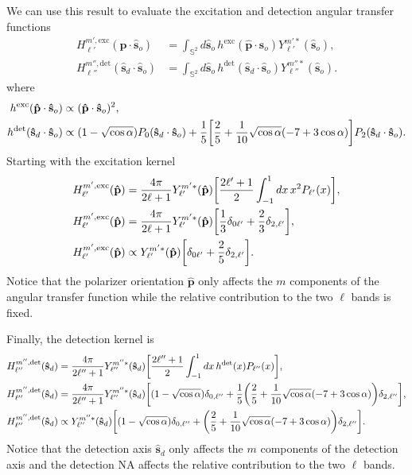 \documentclass[11pt]{article}
\providecommand{\so}{\mathbf{\hat{s}}_o}
\providecommand{\sd}{\mathbf{\hat{s}}_d}
\providecommand{\pp}{\mathbf{\hat{p}}}
\providecommand{\mbb}[1]{\mathbb{#1}}
\providecommand{\ints}[1]{\int_{\mbb{S}^{#1}}}
\let\originalleft\left
\let\originalright\right
\renewcommand{\left}{\mathopen{}\mathclose\bgroup\originalleft}
\renewcommand{\right}{\aftergroup\egroup\originalright}
\begin{document}
We can use this result to evaluate the excitation and detection angular transfer
functions
\begin{align}
  H_{\ell'}^{m',\text{exc}}(\pp\cdot\so) &= \ints{2}d\so\, h^{\text{exc}}(\pp\cdot\so)Y_{\ell'}^{m'*}(\so),\\
  H_{\ell''}^{m'',\text{det}}(\sd\cdot\so) &= \ints{2}d\so\, h^{\text{det}}(\sd\cdot\so)Y_{\ell''}^{m''*}(\so).
\end{align}
where
\begin{align}
  h^{\text{exc}}(\pp\cdot\so) &\propto (\pp\cdot\so)^2, \\
  h^{\text{det}}(\sd\cdot\so) &\propto (1 - \sqrt{\cos\alpha})P_0(\sd\cdot\so) + \frac{1}{5}\left[\frac{2}{5} + \frac{1}{10}\sqrt{\cos\alpha}(-7+3\cos\alpha)\right]P_2(\sd\cdot\so).
\end{align}
Starting with the excitation kernel
\begin{align}
  H_{\ell'}^{m',\text{exc}}(\pp) &= \frac{4\pi}{2\ell + 1}Y_{\ell'}^{m'*}(\pp)\left[\frac{2\ell' + 1}{2}\int_{-1}^1dx\, x^2P_{\ell'}(x)\right],\\
  H_{\ell'}^{m',\text{exc}}(\pp) &=\frac{4\pi}{2\ell + 1}Y_{\ell'}^{m'*}(\pp)\left[\frac{1}{3}\delta_{0\ell'} + \frac{2}{3}\delta_{2,\ell'}\right],\\
  H_{\ell'}^{m',\text{exc}}(\pp) &\propto Y_{\ell'}^{m'*}(\pp)\left[\delta_{0\ell'} + \frac{2}{5}\delta_{2,\ell'}\right].
\end{align}
Notice that the polarizer orientation $\pp$ only affects the $m$ components of
the angular transfer function while the relative contribution to the two $\ell$ bands is fixed.

Finally, the detection kernel is
\begin{align}
  H_{\ell''}^{m'',\text{det}}(\sd) &= \frac{4\pi}{2\ell'' + 1}Y_{\ell''}^{m''*}(\sd)\left[\frac{2\ell'' + 1}{2}\int_{-1}^1dx\, h^{\text{det}}(x)P_{\ell''}(x)\right],\\
  H_{\ell''}^{m'',\text{det}}(\sd) &= \frac{4\pi}{2\ell'' + 1}Y_{\ell''}^{m''*}(\sd)\left[(1 - \sqrt{\cos\alpha})\delta_{0,\ell''} + \frac{1}{5}\left(\frac{2}{5} + \frac{1}{10}\sqrt{\cos\alpha}(-7+3\cos\alpha)\right)\delta_{2,\ell''}\right],\\
  H_{\ell''}^{m'',\text{det}}(\sd) &\propto Y_{\ell''}^{m''*}(\sd)\left[(1 - \sqrt{\cos\alpha})\delta_{0,\ell''} + \left(\frac{2}{5} + \frac{1}{10}\sqrt{\cos\alpha}(-7+3\cos\alpha)\right)\delta_{2,\ell''}\right].
\end{align}
Notice that the detection axis $\sd$ only affects the $m$ components of the
detection axis and the detection NA affects the relative contribution to the two $\ell$ bands. 
\end{document}
